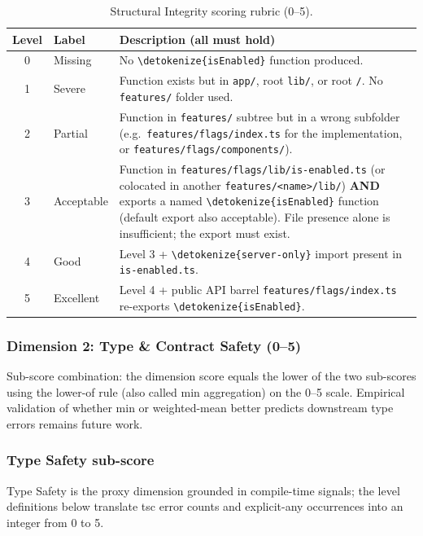 \documentclass[12pt,a4paper]{report}
\newcommand{\code}[1]{\texttt{\nolinkurl{\detokenize{#1}}}}
\DeclareRobustCommand{\filename}[1]{\bgroup\urlstyle{tt}\nolinkurl{#1}\egroup}
\begin{document}
\begin{table}[H]
\centering
\begin{tabular}{clp{9cm}}
\toprule
\textbf{Level} & \textbf{Label} & \textbf{Description (all must hold)} \\
\midrule
0 & Missing & No \code{isEnabled} function produced. \\
1 & Severe & Function exists but in \filename{app/}, root \filename{lib/}, or root \filename{/}. No \filename{features/} folder used. \\
2 & Partial & Function in \filename{features/} subtree but in a wrong subfolder (e.g.\ \filename{features/flags/index.ts} for the implementation, or \filename{features/flags/components/}). \\
3 & Acceptable & Function in \filename{features/flags/lib/is-enabled.ts} (or colocated in another \filename{features/<name>/lib/}) \textbf{AND} exports a named \code{isEnabled} function (default export also acceptable). File presence alone is insufficient; the export must exist. \\
4 & Good & Level 3 + \code{server-only} import present in \filename{is-enabled.ts}. \\
5 & Excellent & Level 4 + public API barrel \filename{features/flags/index.ts} re-exports \code{isEnabled}. \\
\bottomrule
\end{tabular}
\caption{Structural Integrity scoring rubric (0--5).}
\label{tab:rubric-structural}
\end{table}

\subsubsection{Dimension 2: Type \& Contract Safety (0--5)}

Sub-score combination: the dimension score equals the lower of the two sub-scores using the lower-of rule (also called min aggregation) on the 0--5 scale. Empirical validation of whether min or weighted-mean better predicts downstream type errors remains future work.

\subsubsection{Type Safety sub-score}

Type Safety is the proxy dimension grounded in compile-time signals; the level definitions below translate tsc error counts and explicit-any occurrences into an integer from 0 to 5.
\end{document}
